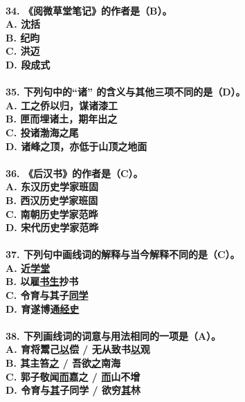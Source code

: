 \documentclass[UTF8]{ctexart} %
\begin{document}
\paragraph{
34. 《阅微草堂笔记》的作者是（\color{red}B\color{black}）。 \\
    A. 沈括 \\
    B. 纪昀 \\
    C. 洪迈 \\
    D. 段成式
}
\paragraph{
35. 下列句中的“诸” 的含义与其他三项不同的是（\color{red}D\color{black}）。 \\
    A. 工之侨以归，谋诸漆工 \\
    B. 匣而埋诸土，期年出之 \\
    C. 投诸渤海之尾 \\
    D. 诸峰之顶，亦低于山顶之地面
}
\paragraph{
36. 《后汉书》的作者是（\color{red}C\color{black}）。 \\
    A. 东汉历史学家班固 \\
    B. 西汉历史学家班固 \\
    C. 南朝历史学家范晔 \\
    D. 宋代历史学家范晔
}
\paragraph{
37. 下列句中画线词的解释与当今解释不同的是（\color{red}C\color{black}）。 \\
    A. 近\uline{学堂} \\
    B. 以雇\uline{书生}抄书 \\
    C. 令育与其子\uline{同学} \\
    D. 育遂博通\uline{经史}
}
\paragraph{
38. 下列画线词的词意与用法相同的一项是（\color{red}A\color{black}）。 \\
    A. 育将鬻己\uline{以}偿 / 无从致书\uline{以}观 \\
    B. 其主笞\uline{之} / 吾欲\uline{之}南海 \\
    C. 郭子敬闻\uline{而}嘉之 / \uline{而}山不增 \\
    D. 令育与\uline{其}子同学 / 欲穷\uline{其}林
}
\end{document}
